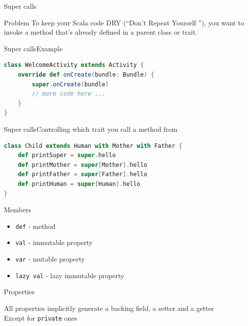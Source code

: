 \documentclass[aspectratio=169]{beamer}
\begin{document}
\begin{frame}{Super calls}
  \begin{block}{Problem}
    To keep your Scala code DRY (“Don’t Repeat Yourself ”), you want to invoke a method that’s
    already defined in a parent class or trait.
  \end{block}
\end{frame}

\begin{frame}[fragile]{Super calls}{Example}
\begin{lstlisting}[style=scala,language=scala]
class WelcomeActivity extends Activity {
    override def onCreate(bundle: Bundle) {
        super.onCreate(bundle)
        // more code here ...
    }
}
\end{lstlisting}
\end{frame}

\begin{frame}[fragile]{Super calls}{Controlling which trait you call a method from}
\begin{lstlisting}[style=scala,language=scala]
class Child extends Human with Mother with Father {
    def printSuper = super.hello
    def printMother = super[Mother].hello
    def printFather = super[Father].hello
    def printHuman = super[Human].hello
}
\end{lstlisting}
\end{frame}

\begin{frame}{Members}
\begin{itemize}
  \item \texttt{def} - method
  \item \texttt{val} - immutable property
  \item \texttt{var} - mutable property
  \item \texttt{lazy val} - lazy immutable property
\end{itemize}
\end{frame}


\begin{frame}{Properties}
  \begin{block}{}
    All properties \alert{implicitly} generate a backing field, a setter and a getter \\
    Except for \texttt{private} ones
  \end{block}
\end{frame}
\end{document}
